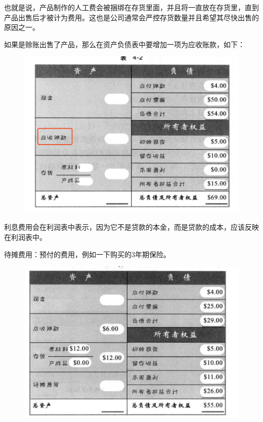 \documentclass[12pt]{article}
\begin{document}
也就是说，产品制作的人工费会被捆绑在存货里面，并且将一直放在存货里，直到产品出售后才被计为费用。这也是公司通常会严控存货数量并且希望其尽快出售的原因之一。

如果是赊账出售了产品，那么在资产负债表中要增加一项为应收账款，如下：
\begin{figure}[H]
    \centering
    \includegraphics[width=1\textwidth]{fig/accounting_6.png}
\end{figure}

利息费用会在利润表中表示，因为它不是贷款的本金，而是贷款的成本，应该反映在利润表中。

待摊费用：预付的费用，例如一下购买的3年期保险。
\begin{figure}[H]
    \centering
    \includegraphics[width=1\textwidth]{fig/accounting_7.png}
\end{figure}
\end{document}
